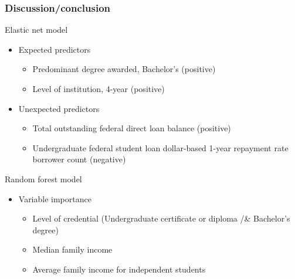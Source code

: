 \documentclass[aspectratio=169, t, 10pt]{beamer}
\begin{document}
\begin{frame}
  \frametitle{Discussion\slash conclusion}
  \begin{block}{Elastic net model}
    \begin{itemize}
    \item Expected predictors 
      \begin{itemize}
         \item Predominant degree awarded, Bachelor's (positive)
         \item Level of institution, 4-year (positive)
      \end{itemize}
    \item Unexpected predictors
       \begin{itemize}
         \item Total outstanding federal direct loan balance (positive)
         \item Undergraduate federal student loan dollar-based 1-year
           repayment rate borrower count (negative)
      \end{itemize}    
    \end{itemize}
  \end{block}
  \begin{block}{Random forest model}
    \begin{itemize}
    \item Variable importance
      \begin{itemize}
        \item Level of credential (Undergraduate certificate or
          diploma /& Bachelor's degree)
        \item Median family income
        \item Average family income for independent students
       \end{itemize}
    \end{itemize}
   \end{block}    
\end{frame}
 
\end{document}
